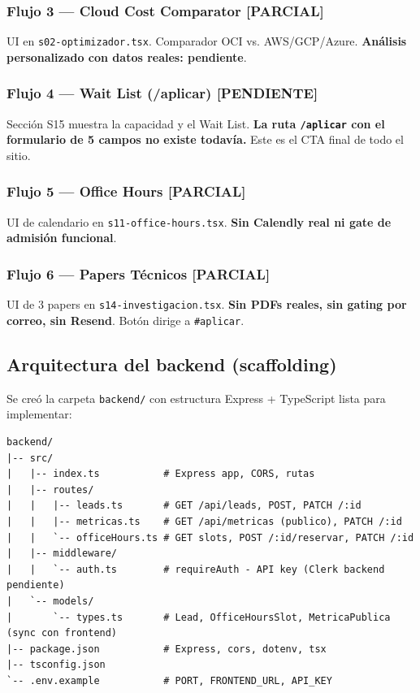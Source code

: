 \documentclass[11pt, a4paper]{article}
\newcommand{\ruta}[1]{\texttt{\color{accent2}#1}}
\newcommand{\pendientetag}{\textbf{\color{danger}[PENDIENTE]}}
\newcommand{\parcialtag}{\textbf{\color{accent2}[PARCIAL]}}
\begin{document}
\subsubsection{Flujo 3 — Cloud Cost Comparator \parcialtag}

UI en \ruta{s02-optimizador.tsx}. Comparador OCI vs. AWS/GCP/Azure.
\textbf{Análisis personalizado con datos reales: pendiente}.

\subsubsection{Flujo 4 — Wait List (/aplicar) \pendientetag}

Sección S15 muestra la capacidad y el Wait List. \textbf{La ruta
\ruta{/aplicar} con el formulario de 5 campos no existe todavía.}
Este es el CTA final de todo el sitio.

\subsubsection{Flujo 5 — Office Hours \parcialtag}

UI de calendario en \ruta{s11-office-hours.tsx}. \textbf{Sin Calendly real ni gate
de admisión funcional}.

\subsubsection{Flujo 6 — Papers Técnicos \parcialtag}

UI de 3 papers en \ruta{s14-investigacion.tsx}. \textbf{Sin PDFs reales, sin
gating por correo, sin Resend}. Botón dirige a \texttt{\#aplicar}.

\subsection{Arquitectura del backend (scaffolding)}

Se creó la carpeta \ruta{backend/} con estructura Express + TypeScript lista
para implementar:

\begin{lstlisting}[caption={backend/ — estructura actual}]
backend/
|-- src/
|   |-- index.ts           # Express app, CORS, rutas
|   |-- routes/
|   |   |-- leads.ts       # GET /api/leads, POST, PATCH /:id
|   |   |-- metricas.ts    # GET /api/metricas (publico), PATCH /:id
|   |   `-- officeHours.ts # GET slots, POST /:id/reservar, PATCH /:id
|   |-- middleware/
|   |   `-- auth.ts        # requireAuth - API key (Clerk backend pendiente)
|   `-- models/
|       `-- types.ts       # Lead, OfficeHoursSlot, MetricaPublica (sync con frontend)
|-- package.json           # Express, cors, dotenv, tsx
|-- tsconfig.json
`-- .env.example           # PORT, FRONTEND_URL, API_KEY
\end{lstlisting}
\end{document}
